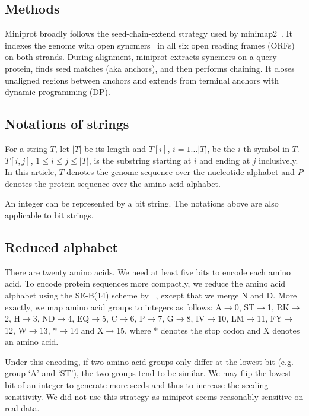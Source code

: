 \documentclass{bioinfo}
\begin{document}
\begin{methods}
\section{Methods}

Miniprot broadly follows the seed-chain-extend strategy used by
minimap2~\citep{Li:2018ab}. It indexes the genome with open
syncmers~\citep{Edgar:2021vk} in all six open reading frames (ORFs) on both
strands. During alignment, miniprot extracts syncmers on a query protein,
finds seed matches (aka anchors), and then performs chaining. It closes
unaligned regions between anchors and extends from terminal anchors with
dynamic programming (DP).

\subsection{Notations of strings}

For a string $T$, let $|T|$ be its length and $T[i]$, $i=1\ldots|T|$, be
the $i$-th symbol in $T$. $T[i,j]$, $1\le i\le j\le|T|$, is the substring
starting at $i$ and ending at $j$ inclusively. In this article, $T$ denotes the
genome sequence over the nucleotide alphabet and $P$ denotes the protein
sequence over the amino acid alphabet.

An integer can be represented by a bit string. The notations above are also
applicable to bit strings.

\subsection{Reduced alphabet}

There are twenty amino acids. We need at least five bits to encode each amino
acid. To encode protein sequences more compactly, we reduce the amino acid
alphabet using the SE-B(14) scheme by ~\citet{Edgar:2004aa}, except that we
merge N and D. More exactly, we map amino acid groups to integers as
follows: A$\to$0, ST$\to$1, RK$\to$2, H$\to$3, ND$\to$4, EQ$\to$5, C$\to$6,
P$\to$7, G$\to$8, IV$\to$10, LM$\to$11, FY$\to$12, W$\to$13, $\ast$$\to$14 and
X$\to$15, where $\ast$ denotes the stop codon and X denotes an amino acid.

Under this encoding, if two amino acid groups only differ at the lowest bit
(e.g. group `A' and `ST'), the two groups tend to be similar. We may flip the
lowest bit of an integer to generate more seeds and thus to increase the
seeding sensitivity. We did not use this strategy as miniprot seems reasonably
sensitive on real data.


\end{methods}
\end{document}
